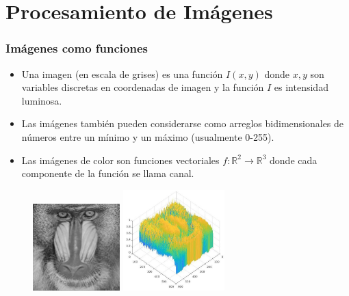 \section[Proc Imágenes]{Procesamiento de Imágenes}
\begin{frame}\frametitle{Imágenes como funciones}
  \begin{itemize}
  \item Una imagen (en escala de grises) es una función $I(x,y)$ donde $x,y$ son variables discretas en coordenadas de imagen y la función $I$ es intensidad luminosa.
    \item Las imágenes también pueden considerarse como arreglos bidimensionales de números entre un mínimo y un máximo (usualmente 0-255).
    \item Las imágenes de color son funciones vectoriales $f:\mathbb{R}^2\rightarrow \mathbb{R}^3$ donde cada componente de la función se llama canal.
  \end{itemize}
  \begin{figure}
    \centering
    \includegraphics[width=0.3\textwidth]{Figures/baboon_grayscale.jpg}
    \includegraphics[width=0.35\textwidth]{Figures/BaboonPlot.jpg}
  \end{figure}
\end{frame}

